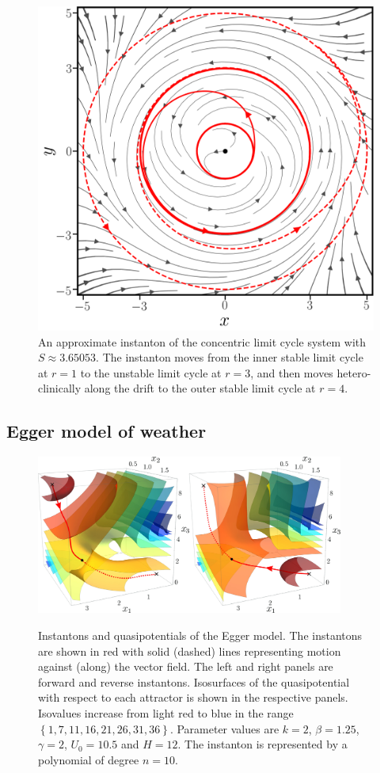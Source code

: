 \begin{figure}[t]
\begin{centering}
\includegraphics[width=0.7\columnwidth]{figs_part1/pyritz/concentric_limit_cycle_instanton.png}
\par\end{centering}
\caption{An approximate instanton of the concentric limit cycle system with $S\approx3.65053$.
The instanton moves from the inner stable limit cycle at $r=1$ to the unstable limit cycle at $r=3$, and then moves hetero-clinically along the drift to the outer stable limit cycle at $r=4$.}
\label{fig:concentric}
\end{figure}

\subsection{Egger model of weather}

\begin{figure}
\begin{centering}
\includegraphics[width=0.9\textwidth]{figs_part1/pyritz/fig3.jpeg}
\par\end{centering}
\caption{Instantons and quasipotentials of the Egger model. The instantons
are shown in red with solid (dashed) lines representing motion against
(along) the vector field. The left and right panels are forward and
reverse instantons. Isosurfaces of the quasipotential with respect
to each attractor is shown in the respective panels. Isovalues increase
from light red to blue in the range $\left\{ 1,7,11,16,21,26,31,36\right\} $.
Parameter values are $k=2$, $\beta=1.25$, $\gamma=2$, $U_{0}=10.5$
and $H=12$. The instanton is represented by a polynomial of degree
$n=10.$}
\centering{}\label{fig:eggers}
\end{figure}

